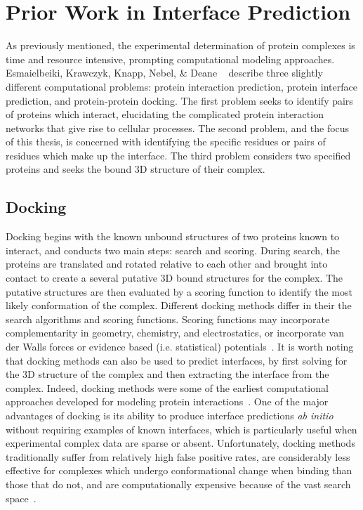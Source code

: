 
\chapter{Prior Work in Interface Prediction}
\label{chap:relatedwork} 


As previously mentioned, the experimental determination of protein complexes is time and resource intensive, prompting computational modeling approaches.
Esmaielbeiki, Krawczyk, Knapp, Nebel, \& Deane ~\cite{esmaielbeiki2015} describe three slightly different computational problems: protein interaction prediction, protein interface prediction, and protein-protein docking.
The first problem seeks to identify pairs of proteins which interact, elucidating the complicated protein interaction networks that give rise to cellular processes. 
The second problem, and the focus of this thesis, is concerned with identifying the specific residues or pairs of residues which make up the interface.
The third problem considers two specified proteins and seeks the bound 3D structure of their complex.

\section{Docking}

Docking begins with the known unbound structures of two proteins known to interact, and conducts two main steps: search and scoring.
During search, the proteins are translated and rotated relative to each other and brought into contact to create a several putative 3D bound structures for the complex.
The putative structures are then evaluated by a scoring function to identify the most likely conformation of the complex.
Different docking methods differ in their the search algorithms and scoring functions.
Scoring functions may incorporate complementarity in geometry, chemistry, and electrostatics, or incorporate van der Walls forces or evidence based (i.e. statistical) potentials~\cite{tuncbag2011}\cite{janin1995}.
It is worth noting that docking methods can also be used to predict interfaces, by first solving for the 3D structure of the complex and then extracting the interface from the complex.
Indeed, docking methods were some of the earliest computational approaches developed for modeling protein interactions~\cite{janin1995}.
One of the major advantages of docking is its ability to produce interface predictions \emph{ab initio} without requiring examples of known interfaces, which is particularly useful when experimental complex data are sparse or absent.
Unfortunately, docking methods traditionally suffer from relatively high false positive rates, are considerably less effective for complexes which undergo conformational change when binding than those that do not, and are computationally expensive because of the vast search space~\cite{janin1995}\cite{tuncbag2011}.

